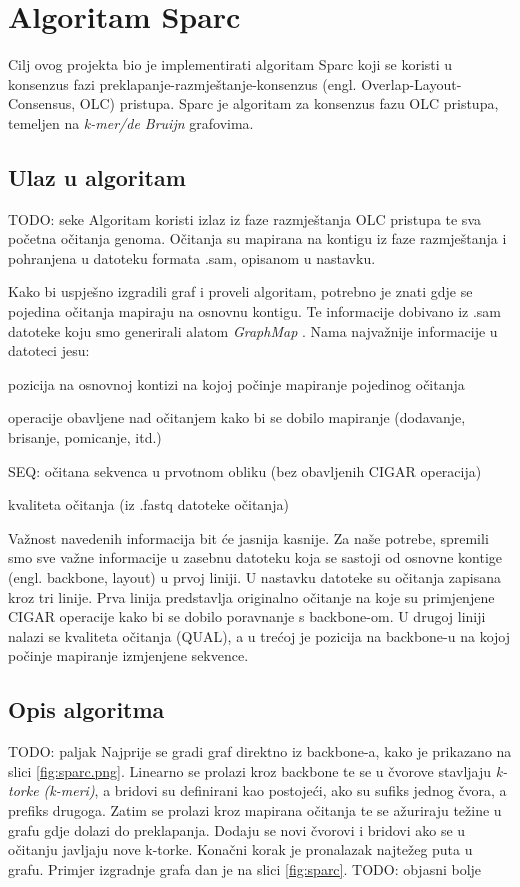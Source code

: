 \chapter{Algoritam Sparc}

Cilj ovog projekta bio je implementirati algoritam Sparc \citep{ye2016sparc} koji se koristi u konsenzus fazi preklapanje-razmještanje-konsenzus (engl. Overlap-Layout-Consensus, OLC) pristupa.
Sparc je algoritam za konsenzus fazu OLC pristupa, temeljen na \emph{k-mer/de Bruijn} \citep{hannenhalli1996positional} grafovima.

\section{Ulaz u algoritam}
TODO: seke
Algoritam koristi izlaz iz faze razmještanja OLC pristupa te sva početna očitanja genoma.
Očitanja su mapirana na kontigu iz faze razmještanja i pohranjena u datoteku formata .sam, opisanom u nastavku.

Kako bi uspješno izgradili graf i proveli algoritam, potrebno je znati gdje se pojedina očitanja mapiraju na osnovnu kontigu.
Te informacije dobivano iz .sam datoteke koju smo generirali alatom \emph{GraphMap} \citep{sovic2016fast}.
Nama najvažnije informacije u datoteci jesu:
\begin{description}
  \item [POS] pozicija na osnovnoj kontizi na kojoj počinje mapiranje pojedinog očitanja
  \item [CIGAR] operacije obavljene nad očitanjem kako bi se dobilo mapiranje (dodavanje, brisanje, pomicanje, itd.)
  \item SEQ: očitana sekvenca u prvotnom obliku (bez obavljenih CIGAR operacija)
  \item [QUAL] kvaliteta očitanja (iz .fastq datoteke očitanja)
\end{description}

Važnost navedenih informacija bit će jasnija kasnije.
Za naše potrebe, spremili smo sve važne informacije u zasebnu datoteku koja se sastoji od osnovne kontige (engl. backbone, layout) u prvoj liniji.
U nastavku datoteke su očitanja zapisana kroz tri linije.
Prva linija predstavlja originalno očitanje na koje su primjenjene CIGAR operacije kako bi se dobilo poravnanje s backbone-om.
U drugoj liniji nalazi se kvaliteta očitanja (QUAL), a u trećoj je pozicija na backbone-u na kojoj počinje mapiranje izmjenjene sekvence.

\section{Opis algoritma}
TODO: paljak
Najprije se gradi graf direktno iz backbone-a, kako je prikazano na slici \ref{fig:sparc.png}.
Linearno se prolazi kroz backbone te se u čvorove stavljaju \emph{k-torke (k-meri)}, a bridovi su definirani kao postojeći, ako su sufiks jednog čvora, a prefiks drugoga. 
Zatim se prolazi kroz mapirana očitanja te se ažuriraju težine u grafu gdje dolazi do preklapanja.
Dodaju se novi čvorovi i bridovi ako se u očitanju javljaju nove k-torke.
Konačni korak je pronalazak najtežeg puta u grafu.
Primjer izgradnje grafa dan je na slici \ref{fig:sparc}.
TODO: objasni bolje


